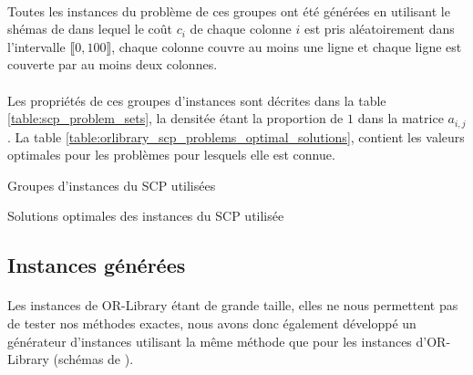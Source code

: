 \documentclass[12pt,letterpaper,twoside]{article}
\begin{document}
			\paragraph*{}
				Toutes les instances du problème de ces groupes ont été générées en utilisant le shémas de \citeauthor{Balas1980}\cite{Balas1980} dans lequel le coût \(c_i\) de chaque colonne \(i\) est pris aléatoirement dans l'intervalle \(\llbracket0,100\rrbracket\), chaque colonne couvre au moins une ligne et chaque ligne est couverte par au moins deux colonnes.
			\paragraph*{}
			   Les propriétés de ces groupes d'instances sont décrites dans la table \ref{table:scp_problem_sets}, la densitée étant la proportion de \(1\) dans la matrice \(a_{i,j}\). La table \ref{table:orlibrary_scp_problems_optimal_solutions}, contient les valeurs optimales pour les problèmes pour lesquels elle est connue.
			\begin{table}[H]
				\centering
				
				\caption{Groupes d'instances du SCP utilisées\cite{OR-Library,Balas1980,Beasley1987,Beasley1990}}
				\label{table:scp_problem_sets}
			\end{table}
			\begin{table}[H]
				\centering
				\begin{minipage}[t]{0.45\linewidth}
					\centering
					
				\end{minipage}
				\begin{minipage}[t]{0.45\linewidth}
					\centering
					
				\end{minipage}
				\caption{Solutions optimales des instances du SCP utilisée\cite{Beasley1990}}
				\label{table:orlibrary_scp_problems_optimal_solutions}
			\end{table}
		\subsection{Instances générées}\label{sec:generated-instances}
			\paragraph*{}
				Les instances de OR-Library étant de grande taille, elles ne nous permettent pas de tester nos méthodes exactes, nous avons donc également développé un générateur d'instances utilisant la même méthode que pour les instances d'OR-Library (schémas de \citeauthor{Balas1980}\cite{Balas1980}).
\end{document}
